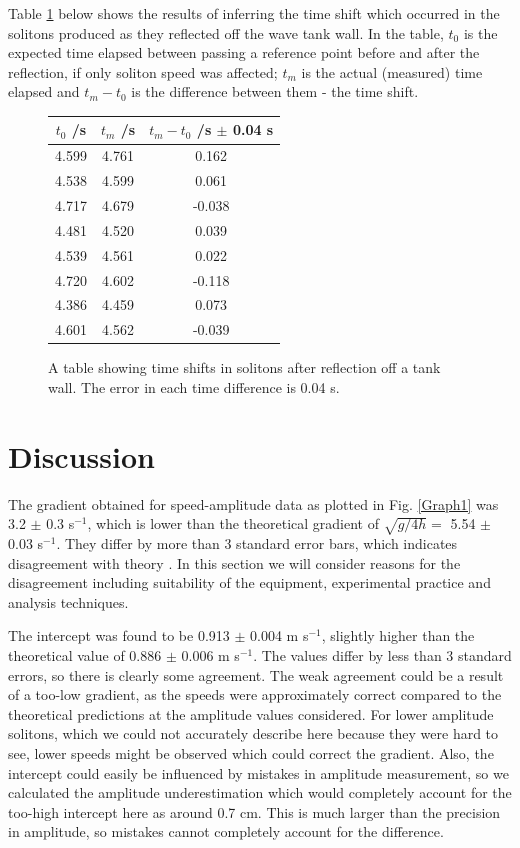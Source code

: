 \documentclass[10pt, twocolumn]{revtex4}    %
\begin{document}
Table \ref{Table} below shows the results of inferring the time shift which occurred in the solitons produced as they reflected off the wave tank wall. In the table, $t_0$ is the expected time elapsed between passing a reference point before and after the reflection, if only soliton speed was affected; $t_m$ is the actual (measured) time elapsed and $t_m - t_0$ is the difference between them - the time shift. 

\begin{figure}[h!]
\begin{tabular}{| c | c | c |} %
\hline
$t_0$ /s & $t_m$ /s & $t_m - t_0$ /s $\pm$ 0.04 s \\ \hline
4.599	& 4.761 		& 0.162 \\ \hline
4.538	& 4.599 		& 0.061 \\ \hline
4.717	& 4.679		& -0.038 \\ \hline
4.481	& 4.520		& 0.039 \\ \hline
4.539	& 4.561		& 0.022 \\ \hline
4.720	& 4.602		& -0.118 \\ \hline
4.386	& 4.459		& 0.073 \\ \hline
4.601	& 4.562		& -0.039 \\
\hline
\end{tabular}
\caption{A table showing time shifts in solitons after reflection off a tank wall. The error in each time difference is 0.04 s.}
\label{Table}
\end{figure}


\section{Discussion} 

The gradient obtained for speed-amplitude data as plotted in Fig. \ref{Graph1} was 3.2 $\pm$ 0.3 s$^{-1}$, which is lower than the theoretical gradient of $\sqrt{g/4h} =$ 5.54 $\pm$ 0.03 s$^{-1}$. They differ by more than 3 standard error bars, which indicates disagreement with theory \cite{Hughes}. In this section we will consider reasons for the disagreement including suitability of the equipment, experimental practice and analysis techniques. 

The intercept was found to be 0.913 $\pm$ 0.004 m s$^{-1}$, slightly higher than the theoretical value of 0.886 $\pm$ 0.006 m s$^{-1}$. The values differ by less than 3 standard errors, so there is clearly some agreement. The weak agreement could be a result of a too-low gradient, as the speeds were approximately correct compared to the theoretical predictions at the amplitude values considered. For lower amplitude solitons, which we could not accurately describe here because they were hard to see, lower speeds might be observed which could correct the gradient. Also, the intercept could easily be influenced by mistakes in amplitude measurement, so we calculated the amplitude underestimation which would completely account for the too-high intercept here as around 0.7 cm. This is much larger than the precision in amplitude, so mistakes cannot completely account for the difference. 
\end{document}
